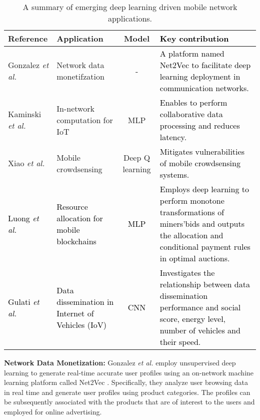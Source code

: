 \documentclass[journal,comsoc,letter]{IEEEtran}
\newcommand{\edit}[1]{\textcolor{black}{#1}}
\begin{document}
\begin{table*}[htb]
\centering
\caption{A summary of emerging deep learning driven mobile network applications.}
\label{tab:emerging}
\begin{tabular}{|C{2.5cm}|C{3cm}|c|C{9cm}|}
\hline
\textbf{Reference}                               & \textbf{Application}                              & \textbf{Model}  & \edit{\textbf{Key contribution}}                                                                                                                                    \\ \hline
Gonzalez \emph{et al.} \cite{gonzalez2017network}  & Network data monetifzation                        & -               & \edit{A platform named Net2Vec to facilitate deep learning deployment in communication networks.}                                                            \\ \hline
Kaminski \emph{et al.} \cite{kaminski2017neural} & In-network computation for IoT                    & MLP             & \edit{Enables to perform collaborative data processing and reduces latency.}                                                                                          \\ \hline
Xiao \emph{et al.} \cite{xiao2017secure}         & Mobile crowdsensing                               & Deep Q learning & \edit{Mitigates vulnerabilities of mobile crowdsensing systems.}                                                                                \\ \hline
\edit{Luong \emph{et al.} \cite{luong2018optimal}} & \edit{Resource allocation for mobile blockchains}   & \edit{MLP}        & \edit{Employs deep learning to perform monotone transformations of miners'bids and outputs the allocation and conditional payment rules in optimal auctions. } \\ \hline
\edit{Gulati \emph{et al.} \cite{gulati2018deep}}  & \edit{Data dissemination in Internet of Vehicles (IoV)} & \edit{CNN}        & \edit{Investigates the relationship between data dissemination performance and social score, energy level, number of vehicles and their speed.}                   \\ \hline
\end{tabular}
\end{table*}

\noindent\textbf{Network Data Monetization:} Gonzalez \emph{et al.} employ unsupervised deep learning to generate real-time accurate user profiles \cite{gonzalez2017network} using an on-network machine learning platform called Net2Vec \cite{gonzalez2017net2vec}. Specifically, they analyze user browsing data in real time and generate user profiles using product categories. The profiles can be subsequently associated with the products that are of interest to the users and employed for online advertising. \\
\end{document}
